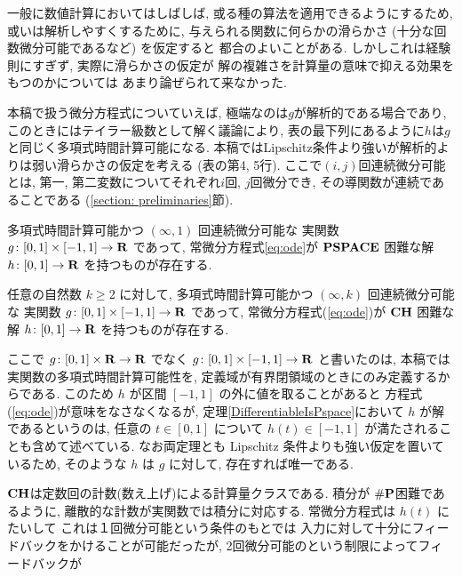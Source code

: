 
一般に数値計算においてはしばしば, 
或る種の算法を適用できるようにするため, 
或いは解析しやすくするために, 
与えられる関数に何らかの滑らかさ (十分な回数微分可能であるなど) を仮定すると
都合のよいことがある. 
しかしこれは経験則にすぎず, 
実際に滑らかさの仮定が
解の複雑さを計算量の意味で抑える効果をもつのかについては
あまり論ぜられて来なかった. 

本稿で扱う微分方程式についていえば, 
極端なのは$g$が解析的である場合であり, 
このときにはテイラー級数として解く議論により, 
表の最下列にあるように$h$は$g$と同じく多項式時間計算可能になる. 
本稿ではLipschitz条件より強いが解析的よりは弱い滑らかさの仮定を考える
(表の第4, 5行). 
ここで$(i, j)$回連続微分可能とは, 
第一, 第二変数についてそれぞれ$i$回, $j$回微分でき, 
その導関数が連続であることである (\ref{section: preliminaries}節).

 \begin{theorem}
  \label{DifferentiableIsPspace}
  多項式時間計算可能かつ $(\infty, 1)$ 回連続微分可能な
  実関数 $g \colon [0,1] \times [-1,1] \to \mathbf R$ であって, 
  常微分方程式\eqref{eq:ode}が
  $\mathbf{PSPACE}$ 困難な解 $h \colon [0, 1] \to \mathbf R$ を持つものが存在する.
 \end{theorem}

 \begin{theorem}
  \label{KTimesIsCH}
  任意の自然数 $k \ge 2$ に対して, 
  多項式時間計算可能かつ $(\infty, k)$ 回連続微分可能な
  実関数 $g \colon [0,1] \times [-1,1] \to \mathbf R$ であって, 
  常微分方程式(\ref{eq:ode})が
  $\mathbf{CH}$ 困難な解 $h \colon [0, 1] \to \mathbf R$ を持つものが存在する.
 \end{theorem}

ここで $g \colon [0,1] \times \mathbf R \to \mathbf R$ でなく
$g \colon [0,1] \times [-1, 1] \to \mathbf R$ と書いたのは, 
本稿では実関数の多項式時間計算可能性を, 
定義域が有界閉領域のときにのみ定義するからである. 
このため $h$ が区間 $[-1, 1]$ の外に値を取ることがあると
方程式(\ref{eq:ode})が意味をなさなくなるが, 
定理\ref{DifferentiableIsPspace}において $h$ が解であるというのは, 
任意の $t \in [0, 1]$ について $h (t) \in [-1, 1]$ が満たされることも含めて述べている.
なお両定理とも Lipschitz 条件よりも強い仮定を置いているため, 
そのような $h$ は $g$ に対して, 存在すれば唯一である. 

$\mathbf{CH}$は定数回の計数(数え上げ)による計算量クラスである.
積分が $\#\mathbf{P}$困難であるように,
離散的な計数が実関数では積分に対応する.
常微分方程式は $h(t)$ にたいして
これは１回微分可能という条件のもとでは
入力に対して十分にフィードバックをかけることが可能だったが,
2回微分可能のという制限によってフィードバックが

